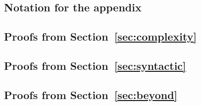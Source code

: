 \documentclass[conference]{IEEEtran}
\begin{document}



\newpage

\onecolumn
\appendix

\subsection{Notation for the appendix}


\medskip

\subsection{Proofs from Section~\ref{sec:complexity}}


\medskip

\subsection{Proofs from Section~\ref{sec:syntactic}}


\medskip

\subsection{Proofs from Section~\ref{sec:beyond}}

\end{document}
